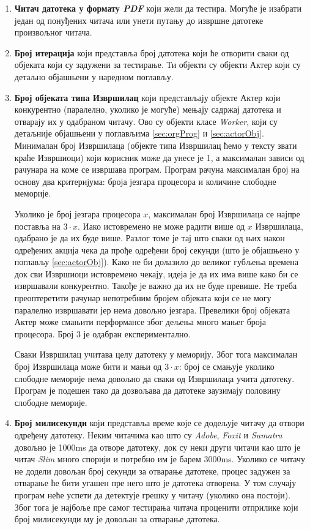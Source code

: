 \documentclass[12pt,oneside]{memoir}
\begin{document}
\begin{enumerate}
\item{\textbf{Читач датотека у формату \textit{PDF}}} који жели да тестира. Могуће је изабрати један од понуђених читача или унети путању до извршне датотеке произвољног читача.
\item{\textbf{Број итерација}} који представља број датотека који ће отворити сваки од објеката који су задужени за тестирање. Ти објекти су објекти Актер који су детаљно објашњени у наредном поглављу. %
\item{\textbf{Број објеката типа Извршилац}} који представљају објекте Актер који конкурентно (паралелно, уколико је могуће) мењају садржај датотека и отварају их у одабраном читачу. Ово су објекти класе \textit{Worker}, који су детаљније објашњени у поглављима \ref{sec:orgProg} и \ref{sec:actorObj}. Минималан број Извршилаца (објекте типа Извршилац ћемо у тексту звати краће Извршиоци) који корисник може да унесе је 1, а максималан зависи од рачунара на коме се извршава програм. Програм рачуна максималан број на основу два критеријума: броја језгара процесора и количине слободне меморије.

Уколико је број језгара процесора $x$, максималан број Извршилаца се најпре поставља на $3 \cdot x$. Иако истовремено не може радити више од $x$ Извршилаца, одабрано је да их буде више. Разлог томе је тај што сваки од њих након одређених акција чека да прође одређени број секунди (што је објашњено у поглављу \ref{sec:actorObj}). Како не би долазило до великог губљења времена док сви Извршиоци истовремено чекају, идеја је да их има више како би се извршавали конкурентно. Такође је важно да их не буде превише. Не треба  преоптеретити рачунар непотребним бројем објеката који се не могу паралелно извршавати јер нема довољно језгара. Превелики број објеката Актер може смањити перформансе због дељења много мањег броја процесора. Број $3$ је одабран експериментално.

Сваки Извршилац учитава целу датотеку у меморију. Због тога максималан број Извршилаца може бити и мањи од $3 \cdot x$: број се смањује уколико слободне меморије нема довољно да сваки од Извршилаца учита датотеку. Програм је подешен тако да дозвољава да датотеке заузимају половину слободне меморије.
\item{\textbf{Број милисекунди}} који представља време које се додељује читачу да отвори одређену датотеку. Неким читачима као што су \textit{Adobe}, \textit{Foxit} и \textit{Sumatra} довољно је 1000ms да отворе датотеку, док су неки други читачи као што је читач \textit{Slim} много спорији и потребно им је барем 3000ms. Уколико се читачу не додели довољан број секунди за отварање датотеке, процес задужен за отварање ће бити угашен пре него што је датотека отворена. У том случају програм неће успети да детектује грешку у читачу (уколико она постоји). Због тога је најбоље пре самог тестирања читача проценити отприлике који број милисекунди му је довољан за отварање датотека.
\end{enumerate}
\end{document}
